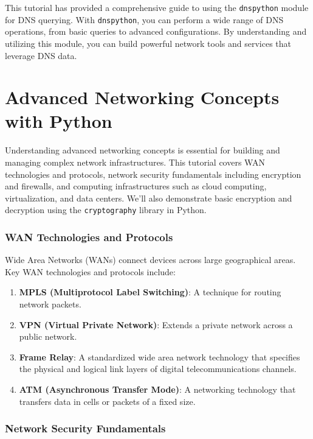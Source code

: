 \documentclass[
  letterpaper,
  DIV=11,
  numbers=noendperiod]{scrreprt}
\providecommand{\tightlist}{%
  \setlength{\itemsep}{0pt}\setlength{\parskip}{0pt}}\usepackage{longtable,booktabs,array}
\begin{document}
This tutorial has provided a comprehensive guide to using the
\texttt{dnspython} module for DNS querying. With \texttt{dnspython}, you
can perform a wide range of DNS operations, from basic queries to
advanced configurations. By understanding and utilizing this module, you
can build powerful network tools and services that leverage DNS data.


\chapter{Advanced Networking Concepts with
Python}\label{advanced-networking-concepts-with-python}

Understanding advanced networking concepts is essential for building and
managing complex network infrastructures. This tutorial covers WAN
technologies and protocols, network security fundamentals including
encryption and firewalls, and computing infrastructures such as cloud
computing, virtualization, and data centers. We'll also demonstrate
basic encryption and decryption using the \texttt{cryptography} library
in Python.

\subsection{WAN Technologies and
Protocols}\label{wan-technologies-and-protocols}

Wide Area Networks (WANs) connect devices across large geographical
areas. Key WAN technologies and protocols include:

\begin{enumerate}
\def\labelenumi{\arabic{enumi}.}
\tightlist
\item
  \textbf{MPLS (Multiprotocol Label Switching)}: A technique for routing
  network packets.
\item
  \textbf{VPN (Virtual Private Network)}: Extends a private network
  across a public network.
\item
  \textbf{Frame Relay}: A standardized wide area network technology that
  specifies the physical and logical link layers of digital
  telecommunications channels.
\item
  \textbf{ATM (Asynchronous Transfer Mode)}: A networking technology
  that transfers data in cells or packets of a fixed size.
\end{enumerate}

\subsection{Network Security
Fundamentals}\label{network-security-fundamentals}
\end{document}
